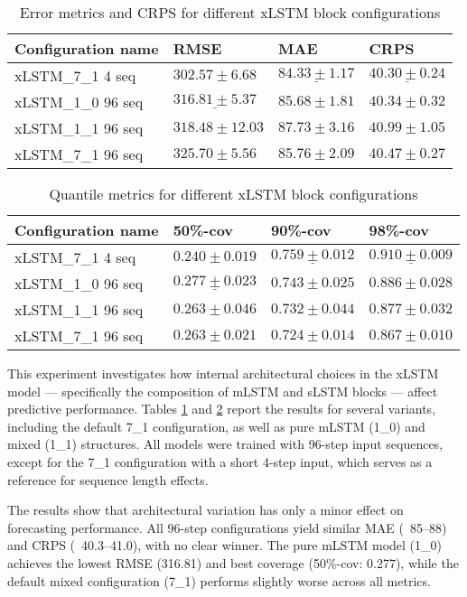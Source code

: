 \documentclass[class=scrbook, crop=false]{standalone}
\begin{document}
  \begin{table}[]
\centering
\begin{tabular}{l|l|l|l}
Configuration name 		&  RMSE 			 & MAE 			 & CRPS			\\\hline
xLSTM\_7\_1 4 seq		&$ 302.57\pm 6.68	$&$ \underline{84.33 \pm 1.17}	$&$ \underline{40.30	\pm0.24} $\\
xLSTM\_1\_0 96 seq		&$\underline{316.81\pm5.37} $&$ 85.68\pm 1.81	$& $40.34	\pm 0.32$\\
xLSTM\_1\_1 96 seq		&$ 318.48\pm12.03 	$&$87.73	\pm 3.16	$&$ 40.99	\pm 1.05$\\
xLSTM\_7\_1 96 seq	 	&$325.70 \pm5.56	$&$85.76\pm 2.09	$&$ 40.47	\pm 0.27$\\ 
\end{tabular}
\caption{Error metrics and CRPS for different xLSTM block configurations}
\label{Table::Performance_xLSTM}

\end{table}
\begin{table}
\centering
\begin{tabular}{l|l|l|l}
Configuration name 		& 50\%-cov 		& 90\%-cov 		& 98\%-cov \\\hline
xLSTM\_7\_1 4 seq	&$ 0.240 \pm 0.019	$&$ \underline{0.759 	\pm 0.012}	$&$ \underline{0.910 \pm 0.009}	 $\\
xLSTM\_1\_0 96 seq		&$\underline{ 0.277 \pm0.023}	$&$  0.743 \pm0.025	$&$ 0.886\pm0.028	$\\
xLSTM\_1\_1 96 seq		&$ 0.263 \pm0.046	$&$ 0.732 \pm0.044	$&$ 0.877\pm 0.032	$\\
xLSTM\_7\_1 96 seq	 	&$ 0.263 \pm0.021	$&$ 0.724 \pm0.014	$&$ 0.867 \pm0.010	$\\ 
\end{tabular}
\caption{Quantile metrics for different xLSTM block configurations}
\label{Table::Performance_xLSTM_quantile}
\end{table}
This experiment investigates how internal architectural choices in the xLSTM model — specifically the composition of mLSTM and sLSTM blocks — affect predictive performance. Tables \ref{Table::Performance_xLSTM} and \ref{Table::Performance_xLSTM_quantile} report the results for several variants, including the default 7\_1 configuration, as well as pure mLSTM (1\_0) and mixed (1\_1) structures. All models were trained with 96-step input sequences, except for the 7\_1 configuration with a short 4-step input, which serves as a reference for sequence length effects.

The results show that architectural variation has only a minor effect on forecasting performance. All 96-step configurations yield similar MAE (~85–88) and CRPS (~40.3–41.0), with no clear winner. The pure mLSTM model (1\_0) achieves the lowest RMSE (316.81) and best coverage (50\%-cov: 0.277), while the default mixed configuration (7\_1) performs slightly worse across all metrics.
\end{document}
